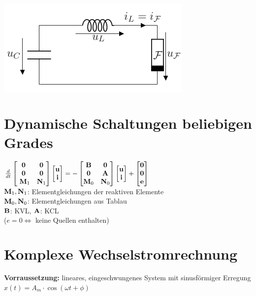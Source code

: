 \documentclass[fs, footer]{latex4ei}
\begin{document}
\begin{multicols*}{4}
\includegraphics[width=.5\linewidth]{img/relaxationsoszillator-schaltung} 
\section{Dynamische Schaltungen beliebigen Grades}
$\frac{d}{dt} \begin{bmatrix} \textbf{0} & \textbf{0}\\\textbf{0} & \textbf{0}\\\ \textbf{M}_1 & \textbf{N}_1 \end{bmatrix}\begin{bmatrix} \textbf{u}\\\textbf{i} \end{bmatrix} = - \begin{bmatrix}  \textbf{B} & \textbf{0} \\ \textbf{0} & \textbf{A} \\ \textbf{M}_0 & \textbf{N}_0 \end{bmatrix}\begin{bmatrix} \textbf{u}\\\textbf{i} \end{bmatrix} + \begin{bmatrix} \textbf{0}\\\textbf{0}\\\textbf{e} \end{bmatrix}$\\
	$\textbf{M}_1, \textbf{N}_1$: Elementgleichungen der reaktiven Elemente\\
	$\textbf{M}_0, \textbf{N}_0$: Elementgleichungen aus Tablau\\
	$\textbf{B}$: KVL, $\textbf{A}$: KCL\\
	($e = 0 \Leftrightarrow$ keine Quellen enthalten)
\section{Komplexe Wechselstromrechnung}
\textbf{Vorraussetzung:} lineares, eingeschwungenes System mit sinusförmiger Erregung $x(t) = A_m \cdot \cos(\omega t + \phi)$\\
\end{multicols*}
\end{document}
